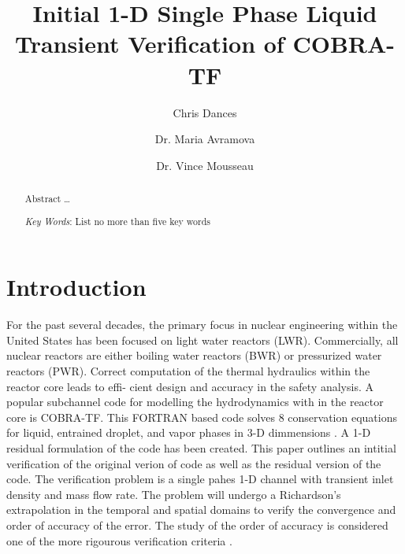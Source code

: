 \documentclass{mc2015}
\begin{document}
\title{Initial 1-D Single Phase Liquid Transient Verification of COBRA-TF}

\author{Chris Dances}
\author{Dr. Maria Avramova}

\author{Dr. Vince Mousseau}

\maketitle

\begin{abstract}
Abstract \ldots

\emph{Key Words}: List no more than five key words
\end{abstract}

\clearpage

%

\section{Introduction}

For the past several decades, the primary focus in nuclear engineering within
the United States has been focused on light water reactors (LWR). Commercially,
all nuclear reactors are either boiling water reactors (BWR) or pressurized
water reactors (PWR). Correct computation of the thermal hydraulics within the
reactor core leads to effi- cient design and accuracy in the safety analysis. A
popular subchannel code for modelling the hydrodynamics with in the reactor core
is COBRA-TF. This FORTRAN based code solves 8 conservation equations for liquid,
entrained droplet, and vapor phases in 3-D dimmensions \cite{CTF_Theory}. A 1-D
residual formulation of the code has been created. This paper outlines an
intitial verification of the original verion of code as well as the residual
version of the code. The verification problem is a single pahes 1-D channel with
transient inlet density and mass flow rate. The problem will undergo a
Richardson's extrapolation in the temporal and spatial domains to verify the
convergence and order of accuracy of the error. The study of the order of
accuracy is considered one of the more rigourous verification criteria
\cite{VV_review}.
\end{document}
